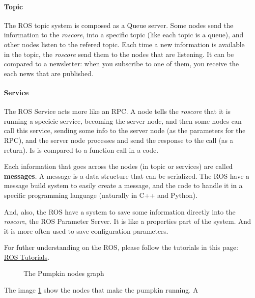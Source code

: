 \documentclass[oneside,a4paper,titlepage]{article}
\begin{document}
\paragraph{Topic} The ROS topic system is composed as a Queue server. Some nodes send the information to the \emph{roscore}, into a specific topic (like each topic is a queue), and other nodes listen to the refered topic. Each time a new information is available in the topic, the \emph{roscore} send them to the nodes that are listening. {\color{blue} It can be compared to a newsletter: when you subscribe to one of them, you receive the each news that are published.}

\paragraph{Service} The ROS Service acts more like an RPC. A node tells the \emph{roscore} that it is running a specicic service, becoming the server node, and then some nodes can call this service, sending some info to the server node (as the parameters for the RPC), and the server node processes and send the response to the call (as a return). {\color{blue} Is is compared to a function call in a code.}

Each information that goes across the nodes (in topic or services) are called \textbf{messages}. A message is a data structure that can be serialized. The ROS have a message build system to easily create a message, and the code to handle it in a specific programming language (naturally in C++ and Python).

And, also, the ROS have a system to save some information directly into the \emph{roscore}, the ROS Parameter Server. It is like a properties part of the system. And it is more often used to save configuration parameters.

For futher understanding on the ROS, please follow the tutorials in this page:
\href{http://wiki.ros.org/ROS/Tutorials}{ROS Tutorials}.

\begin{figure}[ht!]
	\centering
	\caption[Pumpkin Nodes]{The Pumpkin nodes graph}
	\label{fig:nodes}
\end{figure}

The image \ref{fig:nodes} show the nodes that make the pumpkin running. A
\end{document}
